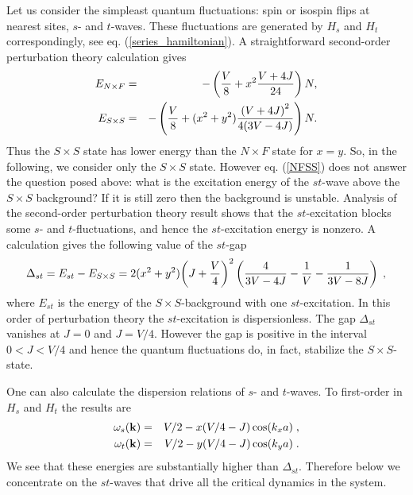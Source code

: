 Let us consider the simpleast quantum fluctuations: spin or isospin
flips at nearest sites, $s$- and $t$-waves. These fluctuations are 
generated by $H_s$ and $H_t$ correspondingly, see eq. 
(\ref{series_hamiltonian}).
A straightforward second-order perturbation theory calculation gives
\begin{eqnarray}
\label{NFSS}
E_{N\times F} & = & 
 -\left({V \over 8} + x^2 {{V + 4J} \over 24}\right)N,\\
E_{S\times S} & = & 
 -\left({V \over 8} + (x^2 + y^2)
{  {{(V + 4J)}^2} \over {4 (3V-4J) } }\right)N.\nonumber 
\end{eqnarray}
Thus the $S\times S$ state has lower energy than the $N\times F$ state 
for $x=y$. So, in the following, we consider only the $S\times S$ state.
However eq. (\ref{NFSS}) does not answer the question posed above: what is
the excitation energy of the $st$-wave above the $S\times S$ background?
If it is still zero then the background is unstable.
Analysis of the second-order perturbation theory result shows that the $st$-excitation
blocks some $s$- and $t$-fluctuations, and hence the $st$-excitation energy is
nonzero. A calculation gives the following value of the $st$-gap
\begin{equation}
\label{deffectenergy}
\Delta_{st}=E_{st} - E_{S\times S} =
2(x^2 +y^2)
{    \left(    J+{V\over 4}  \right)    }^2
\left(
{ 4 \over {3V-4J}} - { 1 \over V} - { 1 \over {3V-8J}}
\right)\; , 
\end{equation}
where $E_{st}$ is the energy of the $S\times S$-background with
one $st$-excitation. In this order of perturbation theory the
$st$-excitation is dispersionless.
The gap $\Delta_{st}$ vanishes at $J=0$ and $J=V/4$.
However the gap is positive in the interval $0< J < V/4$ and hence
the quantum fluctuations do, in fact, stabilize the
$S\times S$-state.

One can also calculate the dispersion relations of $s$- and $t$-waves.
To first-order in $H_s$ and $H_t$ the results are
\begin{eqnarray}
\omega_s({\bf k}) & = & V/2 - x(V/4-J)\cos(k_xa) \; , \\
\omega_t({\bf k}) & = & V/2 - y(V/4-J)\cos(k_ya) \; .
\end{eqnarray}
We see that these energies are substantially higher than $\Delta_{st}$.
Therefore below we concentrate on the $st$-waves that drive all the
critical dynamics in the system.

